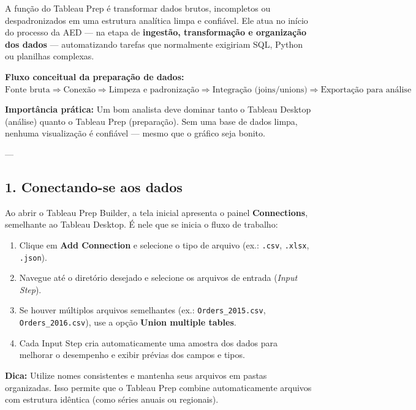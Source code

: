 A função do Tableau Prep é transformar dados brutos, incompletos ou despadronizados em uma estrutura analítica limpa e confiável.  
Ele atua no início do processo da AED — na etapa de \textbf{ingestão, transformação e organização dos dados} — automatizando tarefas que normalmente exigiriam SQL, Python ou planilhas complexas.

\begin{FormulaBox}
\textbf{Fluxo conceitual da preparação de dados:}\\[4pt]
\(\text{Fonte bruta} \Rightarrow \text{Conexão} \Rightarrow \text{Limpeza e padronização} \Rightarrow \text{Integração (joins/unions)} \Rightarrow \text{Exportação para análise}\)
\end{FormulaBox}

\begin{NoteBox}
\textbf{Importância prática:} Um bom analista deve dominar tanto o Tableau Desktop (análise) quanto o Tableau Prep (preparação).  
Sem uma base de dados limpa, nenhuma visualização é confiável — mesmo que o gráfico seja bonito.
\end{NoteBox}

---

\subsection*{1. Conectando-se aos dados}

Ao abrir o Tableau Prep Builder, a tela inicial apresenta o painel \textbf{Connections}, semelhante ao Tableau Desktop.  
É nele que se inicia o fluxo de trabalho:

\begin{enumerate}[leftmargin=*]
  \item Clique em \textbf{Add Connection} e selecione o tipo de arquivo (ex.: \texttt{.csv}, \texttt{.xlsx}, \texttt{.json}).
  \item Navegue até o diretório desejado e selecione os arquivos de entrada (\textit{Input Step}).
  \item Se houver múltiplos arquivos semelhantes (ex.: \texttt{Orders\_2015.csv}, \texttt{Orders\_2016.csv}), use a opção \textbf{Union multiple tables}.
  \item Cada Input Step cria automaticamente uma amostra dos dados para melhorar o desempenho e exibir prévias dos campos e tipos.
\end{enumerate}

\begin{NoteBox}
\textbf{Dica:} Utilize nomes consistentes e mantenha seus arquivos em pastas organizadas.  
Isso permite que o Tableau Prep combine automaticamente arquivos com estrutura idêntica (como séries anuais ou regionais).
\end{NoteBox}

